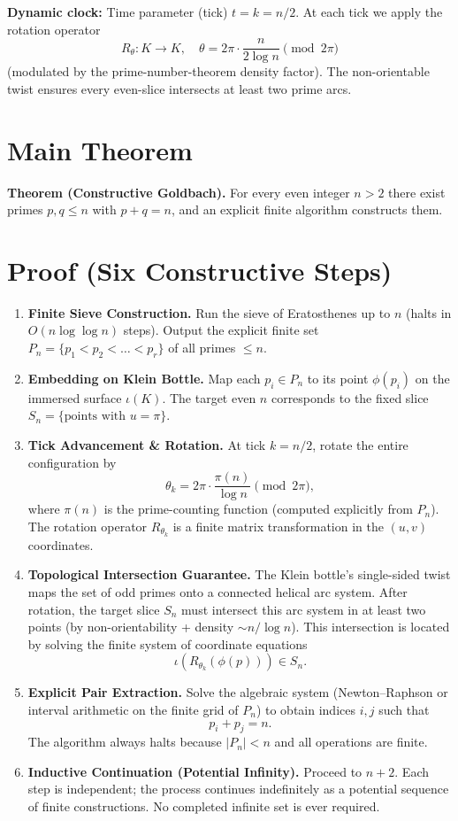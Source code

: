 \documentclass[11pt,a4paper]{article}
\begin{document}
\textbf{Dynamic clock:} Time parameter (tick) $t = k = n/2$. At each tick we apply the rotation operator
\[
R_\theta: K \to K,\quad \theta = 2\pi \cdot \frac{n}{2 \log n} \pmod{2\pi}
\]
(modulated by the prime-number-theorem density factor). The non-orientable twist ensures every even-slice intersects at least two prime arcs.

\section{Main Theorem}

\textbf{Theorem (Constructive Goldbach).} For every even integer $n>2$ there exist primes $p,q \leq n$ with $p+q=n$, and an explicit finite algorithm constructs them.

\section{Proof (Six Constructive Steps)}

\begin{enumerate}
\item \textbf{Finite Sieve Construction.}  
   Run the sieve of Eratosthenes up to $n$ (halts in $O(n \log\log n)$ steps). Output the explicit finite set $P_n = \{p_1 < p_2 < \dots < p_r\}$ of all primes $\leq n$.

\item \textbf{Embedding on Klein Bottle.}  
   Map each $p_i \in P_n$ to its point $\phi(p_i)$ on the immersed surface $\iota(K)$. The target even $n$ corresponds to the fixed slice $S_n = \{ \text{points with } u = \pi \}$.

\item \textbf{Tick Advancement \& Rotation.}  
   At tick $k = n/2$, rotate the entire configuration by
   \[
   \theta_k = 2\pi \cdot \frac{\pi(n)}{\log n} \pmod{2\pi},
   \]
   where $\pi(n)$ is the prime-counting function (computed explicitly from $P_n$). The rotation operator $R_{\theta_k}$ is a finite matrix transformation in the $(u,v)$ coordinates.

\item \textbf{Topological Intersection Guarantee.}  
   The Klein bottle's single-sided twist maps the set of odd primes onto a connected helical arc system. After rotation, the target slice $S_n$ must intersect this arc system in at least two points (by non-orientability + density $\sim n/\log n$). This intersection is located by solving the finite system of coordinate equations
   \[
   \iota(R_{\theta_k}(\phi(p))) \in S_n.
   \]

\item \textbf{Explicit Pair Extraction.}  
   Solve the algebraic system (Newton--Raphson or interval arithmetic on the finite grid of $P_n$) to obtain indices $i,j$ such that
   \[
   p_i + p_j = n.
   \]
   The algorithm always halts because $|P_n| < n$ and all operations are finite.

\item \textbf{Inductive Continuation (Potential Infinity).}  
   Proceed to $n+2$. Each step is independent; the process continues indefinitely as a potential sequence of finite constructions. No completed infinite set is ever required.
\end{enumerate}
\end{document}
